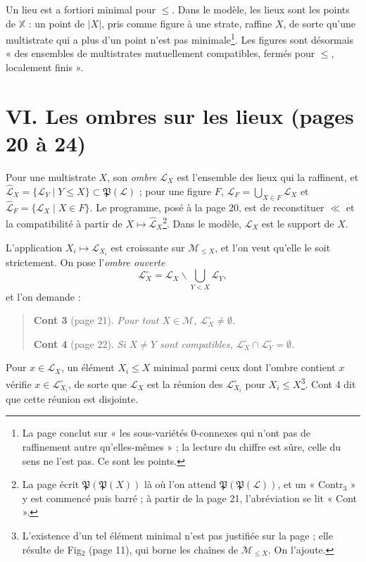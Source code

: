 \documentclass[11pt,a4paper]{article}
\begin{document}
Un lieu est a fortiori minimal pour $\leq$. Dans le modèle, les lieux sont
les points de $\mathbb{X}$ : un point de $|X|$, pris comme figure à
une strate, raffine $X$, de sorte qu'une multistrate qui a plus d'un point
n'est pas minimale\footnote{La page conclut sur « les sous-variétés
$0$-connexes qui n'ont pas de raffinement autre qu'elles-mêmes » ; la lecture
du chiffre est sûre, celle du sens ne l'est pas. Ce sont les points.}. Les
figures sont désormais « des ensembles de multistrates mutuellement
compatibles, fermés pour $\leq$, localement finis ».

\section*{VI. Les ombres sur les lieux (pages 20 à 24)}

Pour une multistrate $X$, son \emph{ombre} $\mathcal{L}_{X}$ est l'ensemble
des lieux qui la raffinent, et $\widehat{\mathcal{L}}_{X} = \{\mathcal{L}_{Y}
\mid Y \leq X\} \subset \mathfrak{P}(\mathcal{L})$ ; pour une figure $F$,
$\mathcal{L}_{F} = \bigcup_{X \in F} \mathcal{L}_{X}$ et
$\widehat{\mathcal{L}}_{F} = \{\mathcal{L}_{X} \mid X \in F\}$. Le programme,
posé à la page 20, est de reconstituer $\ll$ et la compatibilité à partir de
$X \mapsto \widehat{\mathcal{L}}_{X}$\footnote{La page écrit
$\mathfrak{P}(\mathfrak{P}(X))$ là où l'on attend
$\mathfrak{P}(\mathfrak{P}(\mathcal{L}))$, et un « Contr$_{3}$ » y est commencé
puis barré ; à partir de la page 21, l'abréviation se lit « Cont ».}. Dans le
modèle, $\mathcal{L}_{X}$ est le support de $X$.

L'application $X_{i} \mapsto \mathcal{L}_{X_{i}}$ est croissante sur
$\mathcal{M}_{\leq X}$, et l'on veut qu'elle le soit strictement. On pose
l'\emph{ombre ouverte}
\[
\mathcal{L}^{\circ}_{X} = \mathcal{L}_{X} \smallsetminus \bigcup_{Y < X}
\mathcal{L}_{Y},
\]
et l'on demande :

\begin{quote}
\textbf{Cont 3} (page 21). \emph{Pour tout $X \in \mathcal{M}$,
$\mathcal{L}^{\circ}_{X} \neq \emptyset$.}

\textbf{Cont 4} (page 22). \emph{Si $X \neq Y$ sont compatibles,
$\mathcal{L}^{\circ}_{X} \cap \mathcal{L}^{\circ}_{Y} = \emptyset$.}
\end{quote}

Pour $x \in \mathcal{L}_{X}$, un élément $X_{i} \leq X$ minimal parmi ceux dont
l'ombre contient $x$ vérifie $x \in \mathcal{L}^{\circ}_{X_{i}}$, de sorte que
$\mathcal{L}_{X}$ est la réunion des $\mathcal{L}^{\circ}_{X_{i}}$ pour $X_{i}
\leq X$\footnote{L'existence d'un tel élément minimal n'est pas justifiée sur la
page ; elle résulte de Fig$_{2}$ (page 11), qui borne les chaînes de
$\mathcal{M}_{\leq X}$. On l'ajoute.}. Cont 4 dit que cette réunion est
disjointe.
\end{document}
